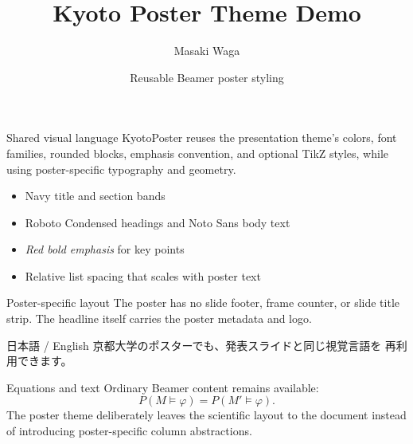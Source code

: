 \documentclass[final]{beamer}
\title{Kyoto Poster Theme Demo}
\author{Masaki Waga}
\institute{Kyoto University}
\date{Reusable Beamer poster styling}
\begin{document}
\begin{frame}[t]
  \vspace{1em}


  \begin{kyotopostertwocolumns*}
    \begin{kyotoposterleftcolumn}
      \begin{block}{Shared visual language}
        KyotoPoster reuses the presentation theme's colors, font
        families, rounded blocks, emphasis convention, and optional
        TikZ styles, while using poster-specific typography and geometry.

        \begin{itemize}
          \item Navy title and section bands
          \item Roboto Condensed headings and Noto Sans body text
          \item \emph{Red bold emphasis} for key points
          \item Relative list spacing that scales with poster text
        \end{itemize}
      \end{block}
    \end{kyotoposterleftcolumn}

    \begin{kyotoposterrightcolumn}
      \begin{alertblock}{Poster-specific layout}
        The poster has no slide footer, frame counter, or slide title
        strip.  The headline itself carries the poster metadata and logo.
      \end{alertblock}

      \begin{exampleblock}{日本語 / English}
        京都大学のポスターでも、発表スライドと同じ視覚言語を
        再利用できます。
      \end{exampleblock}
    \end{kyotoposterrightcolumn}
  \end{kyotopostertwocolumns*}


  \begin{kyotopostertwocolumns*}
    \begin{kyotoposterleftcolumn}
      \begin{block}{Equations and text}
        Ordinary Beamer content remains available:
        \[
          P(M \models \varphi)=P(M' \models \varphi).
        \]
        The poster theme deliberately leaves the scientific layout to the
        document instead of introducing poster-specific column abstractions.
      \end{block}
    \end{kyotoposterleftcolumn}


\end{kyotopostertwocolumns*}
\end{frame}
\end{document}
